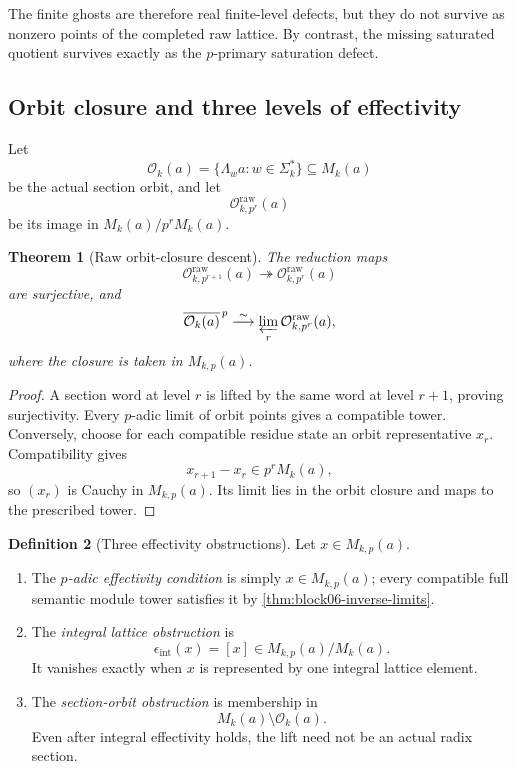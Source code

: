 \documentclass[11pt]{article}
\newtheorem{theorem}{Theorem}[section]
\theoremstyle{definition}
\newtheorem{definition}[theorem]{Definition}
\theoremstyle{remark}
\begin{document}
The finite ghosts are therefore real finite-level defects, but they do not survive as nonzero points of the completed raw lattice.  By contrast, the missing saturated quotient survives exactly as the \(p\)-primary saturation defect.

\subsection{Orbit closure and three levels of effectivity}

Let
\[
\mathcal O_k(a)=\{\Lambda_w a:w\in\Sigma_k^*\}\subseteq M_k(a)
\]
be the actual section orbit, and let
\[
\mathcal O^{\mathrm{raw}}_{k,p^r}(a)
\]
be its image in \(M_k(a)/p^rM_k(a)\).

\begin{theorem}[Raw orbit-closure descent]
\label{thm:block06-orbit-closure}
The reduction maps
\[
\mathcal O^{\mathrm{raw}}_{k,p^{r+1}}(a)
\twoheadrightarrow
\mathcal O^{\mathrm{raw}}_{k,p^r}(a)
\]
are surjective, and
\[
\overline{\mathcal O_k(a)}^{\,p}
\overset{\sim}{\longrightarrow}
\varprojlim_r
\mathcal O^{\mathrm{raw}}_{k,p^r}(a),
\]
where the closure is taken in \(M_{k,p}(a)\).
\end{theorem}

\begin{proof}
A section word at level \(r\) is lifted by the same word at level \(r+1\), proving surjectivity.  Every \(p\)-adic limit of orbit points gives a compatible tower.  Conversely, choose for each compatible residue state an orbit representative \(x_r\).  Compatibility gives
\[
x_{r+1}-x_r\in p^rM_k(a),
\]
so \((x_r)\) is Cauchy in \(M_{k,p}(a)\).  Its limit lies in the orbit closure and maps to the prescribed tower.
\end{proof}

\begin{definition}[Three effectivity obstructions]
\label{def:block06-effectivity}
Let \(x\in M_{k,p}(a)\).
\begin{enumerate}
\item The \emph{\(p\)-adic effectivity condition} is simply \(x\in M_{k,p}(a)\); every compatible full semantic module tower satisfies it by \cref{thm:block06-inverse-limits}.
\item The \emph{integral lattice obstruction} is
\[
\epsilon_{\mathrm{int}}(x)
=
[x]\in M_{k,p}(a)/M_k(a).
\]
It vanishes exactly when \(x\) is represented by one integral lattice element.
\item The \emph{section-orbit obstruction} is membership in
\[
M_k(a)\setminus\mathcal O_k(a).
\]
Even after integral effectivity holds, the lift need not be an actual radix section.
\end{enumerate}
\end{definition}
\end{document}
